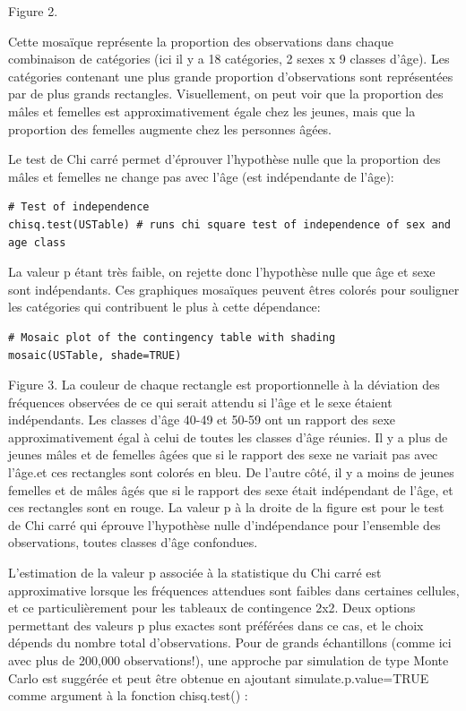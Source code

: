 \documentclass[12pt,]{book}
\begin{document}
Figure 2.

Cette mosaïque représente la proportion des observations dans
chaque combinaison de catégories (ici il y a 18 catégories, 2 sexes x 9
classes d'âge). Les catégories contenant une plus grande proportion
d'observations sont représentées par de plus grands rectangles.
Visuellement, on peut voir que la proportion des mâles et femelles est
approximativement égale chez les jeunes, mais que la proportion des
femelles augmente chez les personnes âgées.

Le test de Chi carré permet d'éprouver l'hypothèse nulle que la
proportion des mâles et femelles ne change pas avec l'âge (est
indépendante de l'âge):

\begin{verbatim}
# Test of independence
chisq.test(USTable) # runs chi square test of independence of sex and age class
\end{verbatim}

La valeur p étant très faible, on rejette donc l'hypothèse nulle que âge
et sexe sont indépendants.
Ces graphiques mosaïques peuvent êtres colorés pour souligner les
catégories qui contribuent le plus à cette dépendance:

\begin{verbatim}
# Mosaic plot of the contingency table with shading
mosaic(USTable, shade=TRUE)
\end{verbatim}

Figure 3.
La couleur de chaque rectangle est proportionnelle à la déviation des
fréquences observées de ce qui serait attendu si l'âge et le sexe étaient
indépendants. Les classes d'âge 40-49 et 50-59 ont un rapport des sexe
approximativement égal à celui de toutes les classes d'âge réunies. Il y
a plus de jeunes mâles et de femelles âgées que si le rapport des sexe
ne variait pas avec l'âge.et ces rectangles sont colorés en bleu. De
l'autre côté, il y a moins de jeunes femelles et de mâles âgés que si le
rapport des sexe était indépendant de l'âge, et ces rectangles sont en
rouge. La valeur p à la droite de la figure est pour le test de Chi carré
qui éprouve l'hypothèse nulle d'indépendance pour l'ensemble des
observations, toutes classes d'âge confondues.

L'estimation de la valeur p associée à la statistique du Chi carré est
approximative lorsque les fréquences attendues sont faibles dans
certaines cellules, et ce particulièrement pour les tableaux de
contingence 2x2. Deux options permettant des valeurs p plus exactes
sont préférées dans ce cas, et le choix dépends du nombre total
d'observations. Pour de grands échantillons (comme ici avec plus de
200,000 observations!), une approche par simulation de type Monte
Carlo est suggérée et peut être obtenue en ajoutant
simulate.p.value=TRUE comme argument à la fonction chisq.test() :
\end{document}

